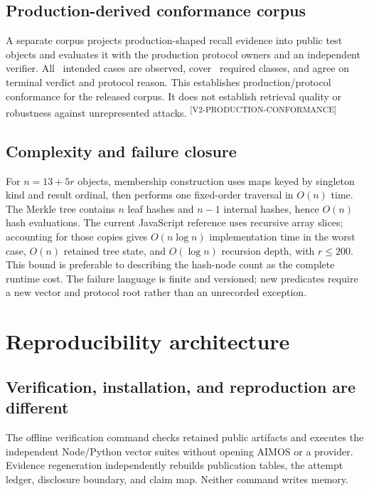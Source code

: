 \documentclass[10pt]{article}
\newcommand{\evidence}[1]{\textsuperscript{\scriptsize\textsf{[#1]}}}
\begin{document}
\subsection{Production-derived conformance corpus}

A separate corpus projects production-shaped recall evidence into public test
objects and evaluates it with the production protocol owners and an independent
verifier. All \MutMemConformanceCount\ intended cases are observed, cover
\MutMemConformanceClassCount\ required classes, and agree on terminal verdict
and protocol reason. This establishes production/protocol conformance for the
released corpus. It does not establish retrieval quality or robustness against
unrepresented attacks. \evidence{V2-PRODUCTION-CONFORMANCE}

\subsection{Complexity and failure closure}

For $n=13+5r$ objects, membership construction uses maps keyed by singleton
kind and result ordinal, then performs one fixed-order traversal in $O(n)$ time.
The Merkle tree contains $n$ leaf hashes and $n-1$ internal hashes, hence
$O(n)$ hash evaluations. The current JavaScript reference uses recursive array
slices; accounting for those copies gives $O(n\log n)$ implementation time in
the worst case, $O(n)$ retained tree state, and $O(\log n)$ recursion depth,
with $r\le 200$. This bound is preferable to describing the hash-node count as
the complete runtime cost. The failure language is finite and versioned; new
predicates require a new vector and protocol root rather than an unrecorded
exception.

\section{Reproducibility architecture}

\subsection{Verification, installation, and reproduction are different}

The offline verification command checks retained public artifacts and executes
the independent Node/Python vector suites without opening AIMOS or a provider.
Evidence regeneration independently rebuilds publication tables, the attempt
ledger, disclosure boundary, and claim map. Neither command writes memory.
\end{document}
